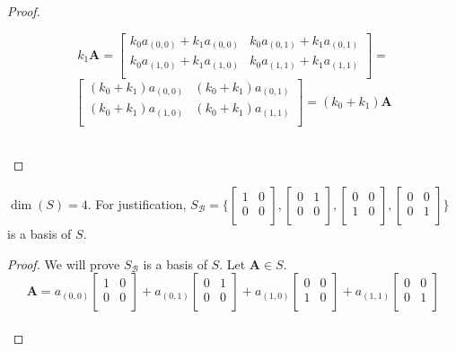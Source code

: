 \documentclass[12pt,oneside]{amsart}
\numberwithin{equation}{section}
\numberwithin{figure}{section}
\theoremstyle{plain}
\theoremstyle{definition}
\begin{document}
\begin{proof}
\begin{enumerate}
\[        k_1\mathbf{A} = 
      \begin{bmatrix}
        k_0a_{(0,0)} + k_1a_{(0,0)} & k_0a_{(0,1)} + k_1a_{(0,1)} \\
        k_0a_{(1,0)} + k_1a_{(1,0)} & k_0a_{(1,1)} + k_1a_{(1,1)} \\
      \end{bmatrix} = \] \[\begin{bmatrix}
        (k_0 + k_1)a_{(0,0)} & (k_0 + k_1)a_{(0,1)} \\
        (k_0 + k_1)a_{(1,0)} & (k_0 + k_1)a_{(1,1)} \\
      \end{bmatrix} = (k_0 + k_1)\mathbf{A}\] \\
  \end{enumerate}
\end{proof}
$\dim(S) = 4$. For justification, $S_{\mathscr{B}} = \bigg\{\begin{bmatrix}
  1 & 0 \\
  0 & 0 \\
\end{bmatrix}, \begin{bmatrix}
  0 & 1 \\
  0 & 0 \\
\end{bmatrix}, \begin{bmatrix}
  0 & 0 \\
  1 & 0 \\
\end{bmatrix}, \begin{bmatrix}
  0 & 0 \\
  0 & 1 \\
\end{bmatrix}\bigg\}$ is a basis of $S$.
\begin{proof}
  We will prove $S_{\mathscr{B}}$ is a basis of $S$. Let $\mathbf{A} \in S.$
  \[\mathbf{A} = 
    a_{(0,0)}\begin{bmatrix}
      1 & 0 \\
      0 & 0 \\
    \end{bmatrix} + a_{(0,1)}\begin{bmatrix}
      0 & 1 \\
      0 & 0 \\
    \end{bmatrix} + a_{(1,0)}\begin{bmatrix}
      0 & 0 \\
      1 & 0 \\
    \end{bmatrix} + a_{(1,1)}\begin{bmatrix}
      0 & 0 \\
      0 & 1 \\
    \end{bmatrix}\] \\
\end{proof}
\end{document}
